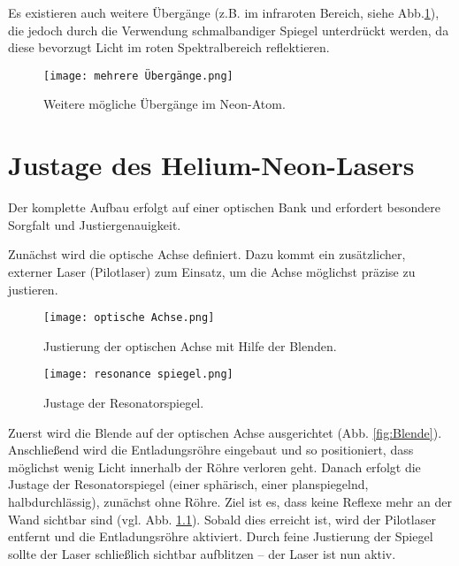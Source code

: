 Es existieren auch weitere Übergänge (z.B. im infraroten Bereich, siehe Abb.\ref{fig:Übergang}), die jedoch durch die Verwendung schmalbandiger Spiegel unterdrückt werden, da diese bevorzugt Licht im roten Spektralbereich reflektieren.

\FloatBarrier
\begin{figure}[htbp]
\centering
\texttt{[image: mehrere Übergänge.png]}
\caption{Weitere mögliche Übergänge im Neon-Atom. \cite{praktikum}}
\label{fig:Übergang}
\end{figure}
\FloatBarrier




\chapter{Justage des Helium-Neon-Lasers}


Der komplette Aufbau erfolgt auf einer optischen Bank und erfordert besondere Sorgfalt und Justiergenauigkeit.

Zunächst wird die optische Achse definiert. 
Dazu kommt ein zusätzlicher, externer Laser (Pilotlaser) zum Einsatz, um die Achse möglichst präzise zu justieren.

\begin{figure}[htbp]
    \centering
    \begin{minipage}[t]{0.48\textwidth}
        \centering
        \texttt{[image: optische Achse.png]}
       \caption{Justierung der optischen Achse mit Hilfe der Blenden. \cite{praktikum}}
        \label{fig:Blende}
    \end{minipage}
    \hfill
    \begin{minipage}[t]{0.48\textwidth}
        \centering
        \texttt{[image: resonance spiegel.png]}
        \caption{Justage der Resonatorspiegel. \cite{praktikum}}
        \label{fig:Spiegel}
   \end{minipage}
\end{figure}

Zuerst wird die Blende auf der optischen Achse ausgerichtet (Abb. \ref{fig:Blende}). 
Anschließend wird die Entladungsröhre eingebaut und so positioniert, dass möglichst wenig Licht innerhalb der Röhre verloren geht.
Danach erfolgt die Justage der Resonatorspiegel (einer sphärisch, einer planspiegelnd, halbdurchlässig), zunächst ohne Röhre. 
Ziel ist es, dass keine Reflexe mehr an der Wand sichtbar sind (vgl. Abb. \ref{fig:Spiegel}). 
Sobald dies erreicht ist, wird der Pilotlaser entfernt und die Entladungsröhre aktiviert. 
Durch feine Justierung der Spiegel sollte der Laser schließlich sichtbar aufblitzen – der Laser ist nun aktiv.



